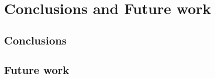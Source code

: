 \chapter{Conclusions and Future work}\label{cha:conclusion}

\section{Conclusions}
\section{Future work}
